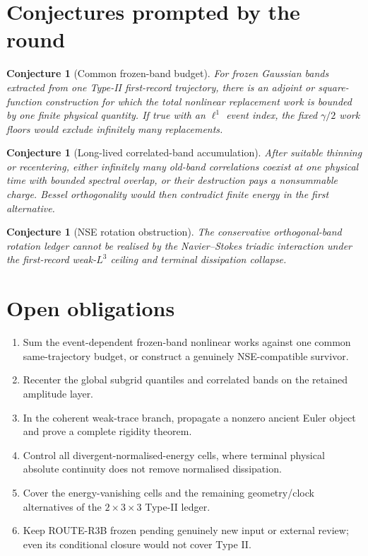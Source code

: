 \documentclass[11pt]{article}
\newtheorem{conjecture}[theorem]{Conjecture}
\theoremstyle{definition}
\theoremstyle{remark}
\begin{document}
\section{Conjectures prompted by the round}

\begin{conjecture}[Common frozen-band budget]
For frozen Gaussian bands extracted from one Type-II first-record trajectory,
there is an adjoint or square-function construction for which the total
nonlinear replacement work is bounded by one finite physical quantity.
If true with an \(\ell^1\) event index, the fixed \(\gamma/2\) work floors
would exclude infinitely many replacements.
\end{conjecture}

\begin{conjecture}[Long-lived correlated-band accumulation]
After suitable thinning or recentering, either infinitely many old-band
correlations coexist at one physical time with bounded spectral overlap, or
their destruction pays a nonsummable charge.  Bessel orthogonality would
then contradict finite energy in the first alternative.
\end{conjecture}

\begin{conjecture}[NSE rotation obstruction]
The conservative orthogonal-band rotation ledger cannot be realised by the
Navier--Stokes triadic interaction under the first-record weak-\(L^3\)
ceiling and terminal dissipation collapse.
\end{conjecture}

\section{Open obligations}

\begin{enumerate}
\item Sum the event-dependent frozen-band nonlinear works against one common
same-trajectory budget, or construct a genuinely NSE-compatible survivor.
\item Recenter the global subgrid quantiles and correlated bands on the
retained amplitude layer.
\item In the coherent weak-trace branch, propagate a nonzero ancient Euler
object and prove a complete rigidity theorem.
\item Control all divergent-normalised-energy cells, where terminal physical
absolute continuity does not remove normalised dissipation.
\item Cover the energy-vanishing cells and the remaining geometry/clock
alternatives of the \(2\times3\times3\) Type-II ledger.
\item Keep ROUTE-R3B frozen pending genuinely new input or external review;
even its conditional closure would not cover Type II.
\end{enumerate}
\end{document}
